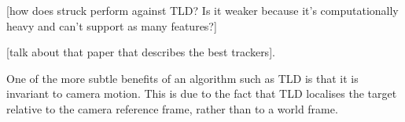 [how does struck perform against TLD? Is it weaker because it's computationally heavy and can't support as many features?]  

[talk about that paper that describes the best trackers].

One of the more subtle benefits of an algorithm such as TLD is that it is invariant to camera motion. This is due to the fact that TLD localises the target relative to the camera reference frame, rather than to a world frame. 









